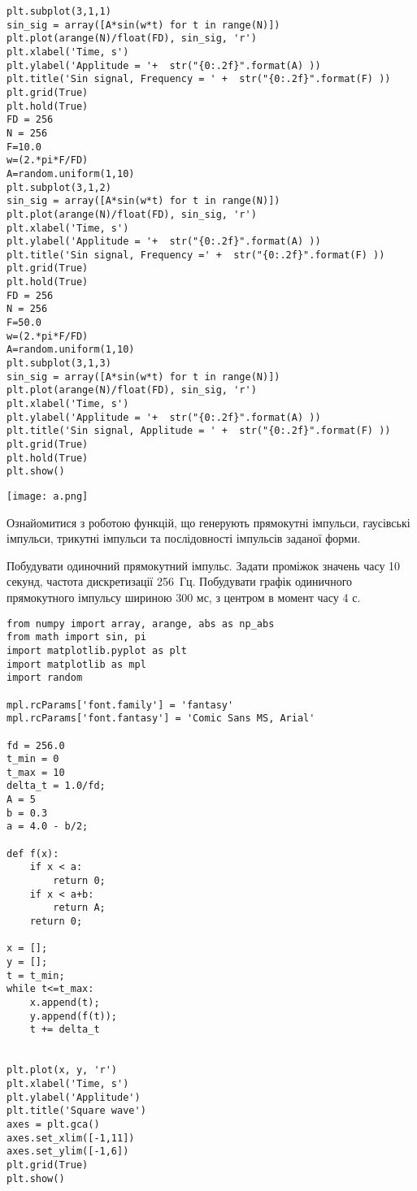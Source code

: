 \documentclass[a4paper,12pt]{article}
\begin{document}
\begin{lstlisting}  
plt.subplot(3,1,1) 
sin_sig = array([A*sin(w*t) for t in range(N)])
plt.plot(arange(N)/float(FD), sin_sig, 'r')
plt.xlabel('Time, s')
plt.ylabel('Applitude = '+  str("{0:.2f}".format(A) ))
plt.title('Sin signal, Frequency = ' +  str("{0:.2f}".format(F) ))
plt.grid(True)
plt.hold(True)
FD = 256
N = 256 
F=10.0
w=(2.*pi*F/FD)
A=random.uniform(1,10) 
plt.subplot(3,1,2) 
sin_sig = array([A*sin(w*t) for t in range(N)])
plt.plot(arange(N)/float(FD), sin_sig, 'r')
plt.xlabel('Time, s')
plt.ylabel('Applitude = '+  str("{0:.2f}".format(A) ))
plt.title('Sin signal, Frequency =' +  str("{0:.2f}".format(F) ))
plt.grid(True)
plt.hold(True)
FD = 256
N = 256
F=50.0
w=(2.*pi*F/FD)
A=random.uniform(1,10)
plt.subplot(3,1,3) 
sin_sig = array([A*sin(w*t) for t in range(N)])
plt.plot(arange(N)/float(FD), sin_sig, 'r')
plt.xlabel('Time, s')
plt.ylabel('Applitude = '+  str("{0:.2f}".format(A) ))
plt.title('Sin signal, Applitude = ' +  str("{0:.2f}".format(F) ))
plt.grid(True)
plt.hold(True)
plt.show()
\end{lstlisting}
\begin{center}
\texttt{[image: a.png]}
\end{center}
    \newpage
{}  Ознайомитися з роботою функцій, що генерують прямокутні імпульси, гаусівські імпульси, трикутні імпульси та послідовності імпульсів заданої форми.\par
{} Побудувати одиночний прямокутний імпульс. Задати проміжок значень часу 10 секунд, частота дискретизації 256 Гц. Побудувати графік одиничного прямокутного імпульсу шириною 300 мс, з центром в момент часу 4 с.\par
\lstset{language=Python}
\begin{lstlisting}  
from numpy import array, arange, abs as np_abs
from math import sin, pi
import matplotlib.pyplot as plt
import matplotlib as mpl
import random

mpl.rcParams['font.family'] = 'fantasy'
mpl.rcParams['font.fantasy'] = 'Comic Sans MS, Arial'

fd = 256.0
t_min = 0
t_max = 10
delta_t = 1.0/fd;
A = 5
b = 0.3
a = 4.0 - b/2;

def f(x):
    if x < a:
        return 0;
    if x < a+b:
        return A;
    return 0;

x = [];
y = [];
t = t_min;
while t<=t_max:
    x.append(t);
    y.append(f(t));
    t += delta_t

    
plt.plot(x, y, 'r')
plt.xlabel('Time, s')
plt.ylabel('Applitude')
plt.title('Square wave')
axes = plt.gca()
axes.set_xlim([-1,11])
axes.set_ylim([-1,6])
plt.grid(True)
plt.show()
\end{lstlisting}
\end{document}
